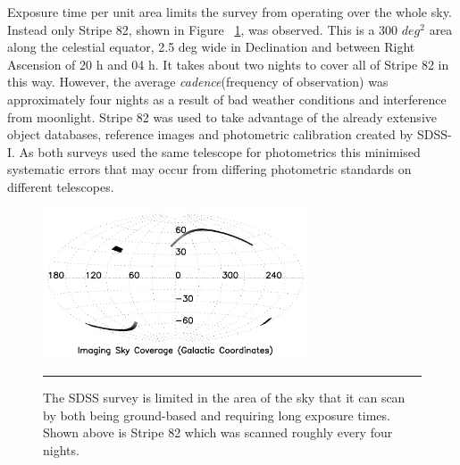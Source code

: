 Exposure time per unit area limits the survey from operating over the whole sky.
Instead only Stripe 82, shown in Figure ~\ref{fig:sky_coverage}, was observed.
This is a 300 $deg^2$ area along the celestial equator, 2.5 deg wide in Declination and between Right Ascension of 20 h and 04 h.
It takes about two nights to cover all of Stripe 82 in this way.
However, the average \textit{cadence}(frequency of observation) was approximately four nights as a result of bad weather conditions and interference from moonlight.
Stripe 82 was used to take advantage of the already extensive object databases, reference images and photometric calibration created by SDSS-I.
As both surveys used the same telescope for photometrics this minimised systematic errors that may occur from differing photometric standards on different telescopes.
\begin{figure}[htbp]
	\centering
		\includegraphics[width = 0.7\textwidth]{./Figures/SDSS_EDR_sky_coverage.jpg}
		\rule{35em}{0.5pt}
	\caption[SDSS Coverage]{The SDSS survey is limited in the area of the sky that it can scan by both being ground-based and requiring long exposure times. Shown above is Stripe 82 which was scanned roughly every four nights.}
	\label{fig:sky_coverage}
\end{figure}

